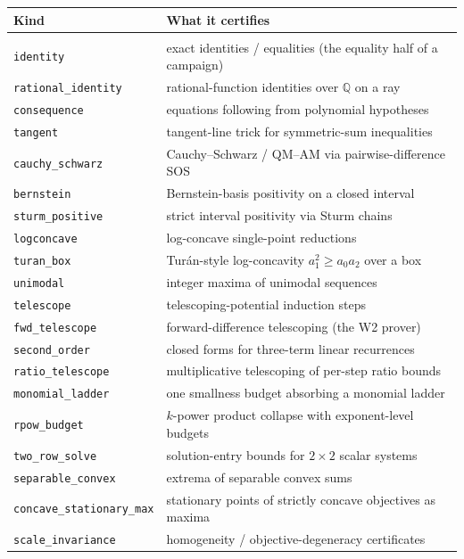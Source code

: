 {\small
\begin{longtable}{@{}p{}p{}@{}}
\toprule
\textbf{Kind} & \textbf{What it certifies} \\
\midrule
\endhead
\bottomrule
\endfoot
\multicolumn{2}{@{}l}{\emph{Algebraic and textbook inequalities}} \\
\texttt{identity} & exact identities / equalities (the equality half of a campaign) \\
\texttt{rational\_identity} & rational-function identities over $\mathbb{Q}$ on a ray \\
\texttt{consequence} & equations following from polynomial hypotheses \\
\texttt{tangent} & tangent-line trick for symmetric-sum inequalities \\
\texttt{cauchy\_schwarz} & Cauchy--Schwarz / QM--AM via pairwise-difference SOS \\
\texttt{bernstein} & Bernstein-basis positivity on a closed interval \\
\texttt{sturm\_positive} & strict interval positivity via Sturm chains \\
\texttt{logconcave} & log-concave single-point reductions \\
\texttt{turan\_box} & Tur\'an-style log-concavity $a_1^2 \ge a_0 a_2$ over a box \\
\texttt{unimodal} & integer maxima of unimodal sequences \\
\texttt{telescope} & telescoping-potential induction steps \\
\texttt{fwd\_telescope} & forward-difference telescoping (the W2 prover) \\
\texttt{second\_order} & closed forms for three-term linear recurrences \\
\texttt{ratio\_telescope} & multiplicative telescoping of per-step ratio bounds \\
\texttt{monomial\_ladder} & one smallness budget absorbing a monomial ladder \\
\texttt{rpow\_budget} & $k$-power product collapse with exponent-level budgets \\
\texttt{two\_row\_solve} & solution-entry bounds for $2\times2$ scalar systems \\
\texttt{separable\_convex} & extrema of separable convex sums \\
\texttt{concave\_stationary\_max} & stationary points of strictly concave objectives as maxima \\
\texttt{scale\_invariance} & homogeneity / objective-degeneracy certificates \\

\end{longtable}}
